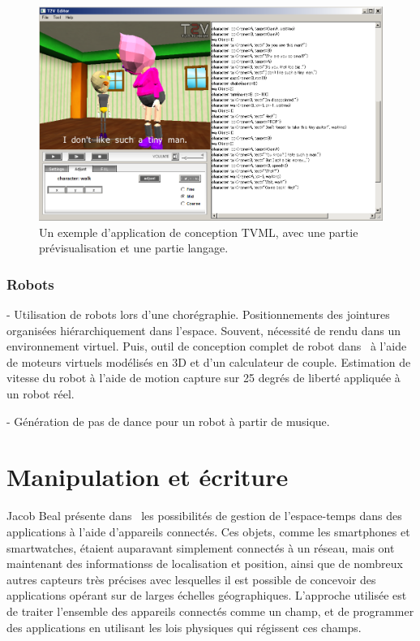 \documentclass[french,12pt]{article}
\begin{document}
\begin{figure}[h]
    \centering
    \includegraphics[scale=0.25]{images/tvml.png}
    \caption{Un exemple d'application de conception TVML, avec une partie prévisualisation et une partie langage.}
    \label{fig.visite.musee}
\end{figure}

\cite{lee_stageviz:_2013}

\subsubsection{Robots}
- Utilisation de robots lors d'une chorégraphie. Positionnements des jointures organisées hiérarchiquement dans l'espace. Souvent, nécessité de rendu dans un environnement virtuel. 
\cite{lee_visualization_2013}
Puis, outil de conception complet de robot dans~\cite{lee_virtual_2014} à l'aide de moteurs virtuels modélisés en 3D et d'un calculateur de couple. Estimation de vitesse du robot à l'aide de motion capture sur 25 degrés de liberté appliquée à un robot réel.

- Génération de pas de dance pour un robot à partir de musique.
\cite{seo_autonomous_2013}

\section{Manipulation et écriture}

Jacob Beal présente dans~\cite{beal_spacetime_2015} les possibilités de gestion de l'espace-temps dans des applications à l'aide d'appareils connectés. Ces objets, comme les smartphones et smartwatches, étaient auparavant simplement connectés à un réseau, mais ont maintenant des informationss de localisation et position, ainsi que de nombreux autres capteurs très précises avec lesquelles il est possible de concevoir des applications opérant sur de larges échelles géographiques. L'approche utilisée est de traiter l'ensemble des appareils connectés comme un champ, et de programmer des applications en utilisant les lois physiques qui régissent ces champs.
\end{document}
